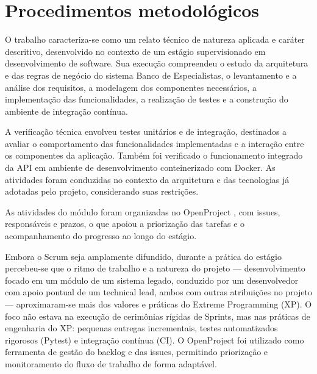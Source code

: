 \section{Procedimentos metodológicos}
\label{sec:procedimentos-metodologicos}

O trabalho caracteriza-se como um relato técnico de natureza aplicada e
caráter descritivo, desenvolvido no contexto de um estágio supervisionado em
desenvolvimento de software. Sua execução compreendeu o estudo da arquitetura
e das regras de negócio do sistema Banco de Especialistas, o levantamento e a
análise dos requisitos, a modelagem dos componentes necessários, a implementação
das funcionalidades, a realização de testes e a construção do ambiente de
integração contínua.

A verificação técnica envolveu testes unitários e de integração, destinados a
avaliar o comportamento das funcionalidades implementadas e a interação entre
os componentes da aplicação. Também foi verificado o funcionamento integrado
da API em ambiente de desenvolvimento conteinerizado com Docker. As atividades
foram conduzidas no contexto da arquitetura e das tecnologias já adotadas pelo
projeto, considerando suas restrições.

As atividades do módulo foram organizadas no OpenProject \cite{openproject2026},
com issues, responsáveis e prazos, o que apoiou a priorização das tarefas e o
acompanhamento do progresso ao longo do estágio.


Embora o Scrum seja amplamente difundido, durante a prática do estágio
percebeu-se que o ritmo de trabalho e a natureza do projeto — desenvolvimento
focado em um módulo de um sistema legado, conduzido por um desenvolvedor com
apoio pontual de um technical lead, ambos com outras atribuições no projeto —
aproximaram-se mais dos valores e práticas do Extreme Programming (XP). O foco
não estava na execução de cerimônias rígidas de Sprints, mas nas práticas de
engenharia do XP: pequenas entregas incrementais, testes automatizados
rigorosos (Pytest) e integração contínua (CI). O OpenProject foi utilizado
como ferramenta de gestão do backlog e das issues, permitindo priorização e
monitoramento do fluxo de trabalho de forma adaptável.